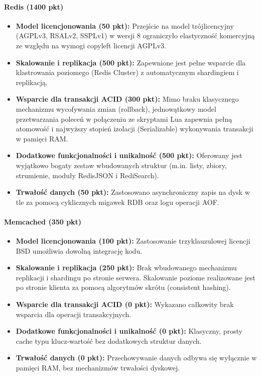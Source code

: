 \paragraph{Redis (1400 pkt)}
\begin{itemize}
    \item \textbf{Model licencjonowania (50 pkt):} Przejście na model trójlicencyjny (AGPLv3, RSALv2, SSPLv1) w wersji 8 ograniczyło elastyczność komercyjną ze względu na wymogi copyleft licencji AGPLv3.
    \item \textbf{Skalowanie i replikacja (500 pkt):} Zapewnione jest pełne wsparcie dla klastrowania poziomego (Redis Cluster) z automatycznym shardingiem i replikacją.
    \item \textbf{Wsparcie dla transakcji ACID (300 pkt):} Mimo braku klasycznego mechanizmu wycofywania zmian (rollback), jednowątkowy model przetwarzania poleceń w połączeniu ze skryptami Lua zapewnia pełną atomowość i najwyższy stopień izolacji (Serializable) wykonywania transakcji w pamięci RAM.
    \item \textbf{Dodatkowe funkcjonalności i unikalność (500 pkt):} Oferowany jest wyjątkowo bogaty zestaw wbudowanych struktur (m.in. listy, zbiory, strumienie, moduły RedisJSON i RediSearch).
    \item \textbf{Trwałość danych (50 pkt):} Zastosowano asynchroniczny zapis na dysk w tle za pomocą cyklicznych migawek RDB oraz logu operacji AOF.
\end{itemize}

\paragraph{Memcached (350 pkt)}
\begin{itemize}
    \item \textbf{Model licencjonowania (100 pkt):} Zastosowanie trzyklauzulowej licencji BSD umożliwia dowolną integrację kodu.
    \item \textbf{Skalowanie i replikacja (250 pkt):} Brak wbudowanego mechanizmu replikacji i shardingu po stronie serwera. Skalowanie poziome realizowane jest po stronie klienta za pomocą algorytmów skrótu (consistent hashing).
    \item \textbf{Wsparcie dla transakcji ACID (0 pkt):} Wykazano całkowity brak wsparcia dla operacji transakcyjnych.
    \item \textbf{Dodatkowe funkcjonalności i unikalność (0 pkt):} Klasyczny, prosty cache typu klucz-wartość bez dodatkowych struktur danych.
    \item \textbf{Trwałość danych (0 pkt):} Przechowywanie danych odbywa się wyłącznie w pamięci RAM, bez mechanizmów trwałości dyskowej.
\end{itemize}

